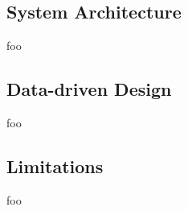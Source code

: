 
\subsection{System Architecture}



foo


\subsection{Data-driven Design}

foo



\subsection{Limitations}


foo
